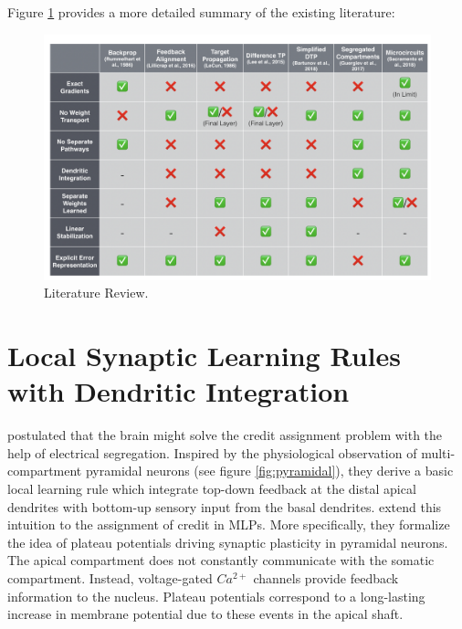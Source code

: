 \documentclass[colorinlistoftodos]{article}
\theoremstyle{definition}
\begin{document}
Figure \ref{fig:lit_rev} provides a more detailed summary of the existing literature:

\begin{figure}[H]
	\centering
	\includegraphics[width=\textwidth]{../figures/report/lit_rev}
	\caption{Literature Review.}	\label{fig:lit_rev}
\end{figure}

\newpage
\section{Local Synaptic Learning Rules with Dendritic Integration}

\citet{kording2001} postulated that the brain might solve the credit assignment problem with the help of electrical segregation. Inspired by the physiological observation of multi-compartment pyramidal neurons (see figure \ref{fig:pyramidal}), they derive a basic local learning rule which integrate top-down feedback at the distal apical dendrites with bottom-up sensory input from the basal dendrites. 
\citet{guerguiev2017} extend this intuition to the assignment of credit in MLPs. More specifically, they formalize the idea of plateau potentials driving synaptic plasticity in pyramidal neurons. The apical compartment does not constantly communicate with the somatic compartment. Instead, voltage-gated $Ca^{2+}$ channels provide feedback information to the nucleus. Plateau potentials correspond to a long-lasting increase in membrane potential due to these events in the apical shaft. 
\end{document}
